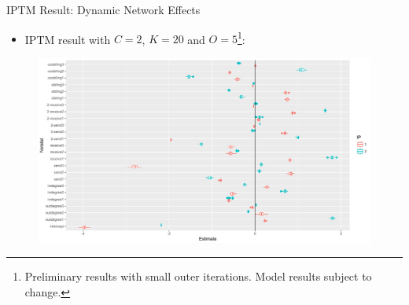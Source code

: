 \documentclass[10pt]{beamer}
\def\bni{\begin{itemize}} \def\ei{\end{itemize}}
\theoremstyle{definition}
\theoremstyle{remark}
\begin{document}
\begin{frame}{IPTM Result: Dynamic Network Effects}
	\bni \item IPTM result with $C=2$, $K=20$ and $O= 5$\footnote{Preliminary results with small outer iterations. Model results subject to change.}:
		\ei
  				 		 \begin{figure}
  				 		 	\includegraphics[width=1\textwidth]{figures/Netplot.pdf}
  				 		 \end{figure}	
  				 		\end{frame}
\end{document}
